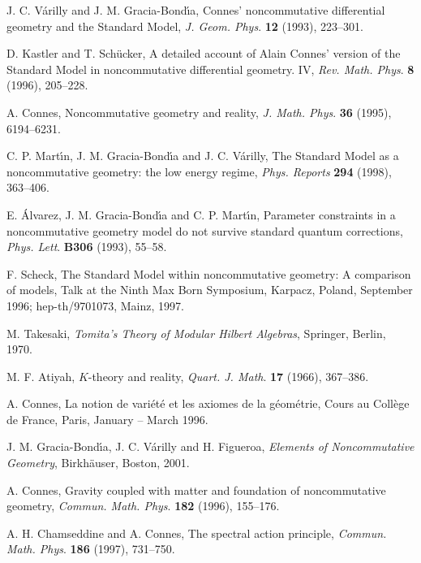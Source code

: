 \documentclass[a4paper,12pt]{article}
\newcommand{\1}{\mathbf{1}}         %
\newcommand{\7}{\dagger}            %
\newcommand{\8}{\bullet}            %
\renewcommand{\.}{\cdot}            %
\renewcommand{\:}{\colon}           %
\begin{document}
\begin{thebibliography}{74}
J. C. V\'arilly and J. M. Gracia-Bond\'{\i}a,
Connes' noncommutative differential geometry and the
Standard Model,
\textit{J. Geom. Phys}. {\bf 12} (1993), 223--301.

D. Kastler and T. Sch\"ucker,
A detailed account of Alain Connes' version of the Standard Model
in noncommutative differential geometry. IV,
\textit{Rev. Math. Phys}. {\bf 8} (1996), 205--228.

A. Connes,
Noncommutative geometry and reality,
\textit{J. Math. Phys}. {\bf 36} (1995), 6194--6231.

C. P. Mart\'{\i}n, J. M. Gracia-Bond\'{\i}a and J. C. V\'arilly,
The Standard Model as a noncommutative geometry: the low energy
regime,
\textit{Phys. Reports} {\bf 294} (1998), 363--406.

E. \'Alvarez, J. M. Gracia-Bond\'{\i}a and C. P. Mart\'{\i}n,
Parameter constraints in a noncommutative geometry model do not
survive standard quantum corrections,
\textit{Phys. Lett}. {\bf B306} (1993), 55--58.

F. Scheck,
The Standard Model within noncommutative geometry: A comparison of
models,
Talk at the Ninth Max Born Symposium, Karpacz, Poland, September 1996;
hep-th/9701073, Mainz, 1997.

M. Takesaki,
\textit{Tomita's Theory of Modular Hilbert Algebras},
Springer, Berlin, 1970.

M. F. Atiyah,
$K$-theory and reality,
\textit{Quart. J. Math}. {\bf 17} (1966), 367--386.

A. Connes,
La notion de vari\'et\'e et les axiomes de la g\'eom\'etrie,
Cours au Coll\`ege de France,
Paris, January -- March 1996.

J. M. Gracia-Bond\'{\i}a, J. C. V\'arilly and H. Figueroa,
\textit{Elements of Noncommutative Geometry},
Birkh\"auser, Boston, 2001.

A. Connes,
Gravity coupled with matter and foundation of noncommutative
geometry,
\textit{Commun. Math. Phys}. {\bf 182} (1996), 155--176.

A. H. Chamseddine and A. Connes,
The spectral action principle,
\textit{Commun. Math. Phys}. {\bf 186} (1997), 731--750.


\end{thebibliography}
\end{document}

